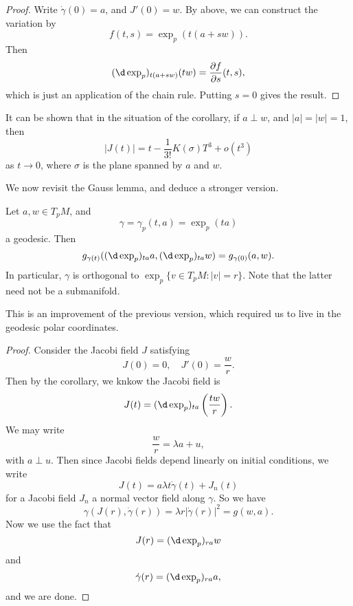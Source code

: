 \documentclass[a4paper]{article}
\begin{document}
\begin{proof}
  Write $\dot{\gamma}(0) = a$, and $J'(0) = w$. By above, we can construct the variation by
  \[
    f(t, s) = \exp_p(t (a + sw)).
  \]
  Then
  \[
    (\d \exp_p)_{t(a + sw)} (tw) = \frac{\partial f}{\partial s}(t, s),
  \]
  which is just an application of the chain rule. Putting $s = 0$ gives the result.
\end{proof}

It can be shown that in the situation of the corollary, if $a \perp w$, and $|a| = |w| = 1$, then
\[
  |J(t)| = t - \frac{1}{3!} K(\sigma) T^3 + o(t^3)
\]
as $t \to 0$, where $\sigma$ is the plane spanned by $a$ and $w$.

We now revisit the Gauss lemma, and deduce a stronger version.
\begin{lemma}
  Let $a, w \in T_p M$, and
  \[
    \gamma = \gamma_p(t, a) = \exp_p(ta)
  \]
  a geodesic. Then
  \[
    g_{\gamma(t)} ((\d \exp_p)_{ta} a, (\d \exp_p)_{ta} w) = g_{\gamma(0)}(a, w).
  \]
  In particular, $\gamma$ is orthogonal to $\exp_p \{v \in T_p M: |v| = r\}$. Note that the latter need not be a submanifold.
\end{lemma}
This is an improvement of the previous version, which required us to live in the geodesic polar coordinates.

\begin{proof}
  Consider the Jacobi field $J$ satisfying
  \[
    J(0) = 0,\quad J'(0) = \frac{w}{r}.
  \]
  Then by the corollary, we knkow the Jacobi field is
  \[
    J(t) = (\d \exp_p)_{ta} \left(\frac{tw}{r}\right).
  \]
  We may write
  \[
    \frac{w}{r} = \lambda a + u,
  \]
  with $a \perp u$. Then since Jacobi fields depend linearly on initial conditions, we write
  \[
    J(t) = a\lambda t \dot{\gamma}(t) + J_n(t)
  \]
  for a Jacobi field $J_n$ a normal vector field along $\gamma$. So we have
  \[
    \gamma(J(r), \dot{\gamma}(r)) = \lambda r |\dot{\gamma}(r)|^2 = g(w, a).
  \]
  Now we use the fact that
  \[
    J(r) = (\d \exp_p)_{ra} w
  \]
  and
  \[
    \dot{\gamma}(r) = (\d \exp_p)_{ra} a,
  \]
  and we are done.
\end{proof}
\end{document}
